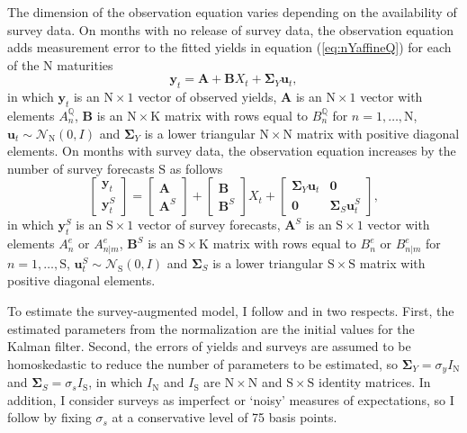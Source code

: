 \documentclass[a4paper, 12pt]{article}
\providecommand{\tnr}{n}
\providecommand{\tnrfwd}{m}
\providecommand{\idxt}{t}
\providecommand{\idxsfwd}{\tnr | \tnrfwd}
\providecommand{\yld}{y}
\providecommand{\xpc}{e}
\providecommand{\Xvars}{X_{\idxt}}
\providecommand{\affineA}{A_{\tnr}}
\providecommand{\affineB}{B_{\tnr}}
\providecommand{\affineAQ}{\affineA^{\Qmeasure}}
\providecommand{\affineBQ}{\affineB^{\Qmeasure}}
\providecommand{\affineAe}{\affineA^{\xpc}}
\providecommand{\affineBe}{\affineB^{\xpc}}
\providecommand{\affineAeFwd}{A_{\idxsfwd}^{\xpc}}
\providecommand{\affineBeFwd}{B_{\idxsfwd}^{\xpc}}
\providecommand{\Xdim}{\mathrm{K}}
\providecommand{\Ydim}{\mathrm{N}}
\providecommand{\Sdim}{\mathrm{S}}
\providecommand{\Normal}{\mathcal{N}}
\providecommand{\Qmeasure}{\mathbb{Q}}
\providecommand{\Svy}{S}
\providecommand{\yVec}{\mathbf{\yld}_{t}}
\providecommand{\ySVec}{\yVec^{\Svy}}
\providecommand{\Avec}{\mathbf{A}}
\providecommand{\Bvec}{\mathbf{B}}
\providecommand{\ASvec}{\mathbf{A}^{\Svy}}
\providecommand{\BSvec}{\mathbf{B}^{\Svy}}
\providecommand{\uVec}{\mathbf{u}_{t}}
\providecommand{\uSVec}{\mathbf{u}_{t}^{\Svy}}
\providecommand{\Svec}{\mathbf{\Sigma}}
\providecommand{\SyVec}{\mathbf{\Svec}_{Y}}
\providecommand{\SsVec}{\mathbf{\Svec}_{\Svy}}
\newcommand{\eqyVecY}{\yVec = \Avec + \Bvec \Xvars + \SyVec \uVec}
\begin{document}
The dimension of the observation equation varies depending on the availability of survey data. On months with no release of survey data, the observation equation adds measurement error to the fitted yields in equation (\ref{eq:nYaffineQ}) for each of the \(\Ydim\) maturities
\begin{equation} \label{eq:nYaffineY}
\eqyVecY,
\end{equation}
in which \(\yVec\) is an \(\Ydim \times 1\) vector of observed yields, \(\Avec\) is an \(\Ydim \times 1\) vector with elements \(\affineAQ\), \(\Bvec\) is an \(\Ydim \times \Xdim\) matrix with rows equal to \(\affineBQ\) for \(n = 1, \ldots, \Ydim\), \(\uVec \sim \Normal_\Ydim (0,I) \) and \(\SyVec\) is a lower triangular \(\Ydim \times \Ydim\) matrix with positive diagonal elements. On months with survey data, the observation equation increases by the number of survey forecasts \(\Sdim\) as follows 
\begin{equation} \label{eq:nYaffineYS}
\begin{bmatrix}
\yVec \\ 
\ySVec
\end{bmatrix} 
= 
\begin{bmatrix}
\Avec \\
\ASvec
\end{bmatrix} 
+
\begin{bmatrix}
\Bvec \\
\BSvec  
\end{bmatrix} 
\Xvars
+
\begin{bmatrix}
\SyVec \uVec & \mathbf{0} \\
\mathbf{0}     & \SsVec \uSVec
\end{bmatrix} ,
\end{equation}
in which \(\ySVec\) is an \(\Sdim \times 1\) vector of survey forecasts, \(\ASvec\) is an \(\Sdim \times 1\) vector with elements \(\affineAe\) or \(\affineAeFwd\), \(\BSvec\) is an \(\Sdim \times \Xdim\) matrix with rows equal to \(\affineBe\) or \(\affineBeFwd\) for \(n = 1, \ldots, \Sdim\), \(\uSVec \sim \Normal_\Sdim (0,I) \) and \(\SsVec\) is a lower triangular \(\Sdim \times \Sdim\) matrix with positive diagonal elements. 

To estimate the survey-augmented model, I follow \cite{Guimaraes:2014} and \cite{Lloyd:2020} in two respects. First, the estimated parameters from the \cite{JSZ:2011} normalization are the initial values for the Kalman filter. Second, the errors of yields and surveys are assumed to be homoskedastic to reduce the number of parameters to be estimated, so \(\SyVec = \sigma_y I_{\Ydim}\) and \(\SsVec = \sigma_s I_{\Sdim}\), in which \(I_{\Ydim}\) and \(I_{\Sdim}\) are \(\Ydim \times \Ydim\) and \(\Sdim \times \Sdim\) identity matrices. In addition, I consider surveys as imperfect or `noisy' measures of expectations, so I follow \cite{KimOrphanides:2012} by fixing \(\sigma_s\) at a conservative level of 75 basis points. 
\end{document}
